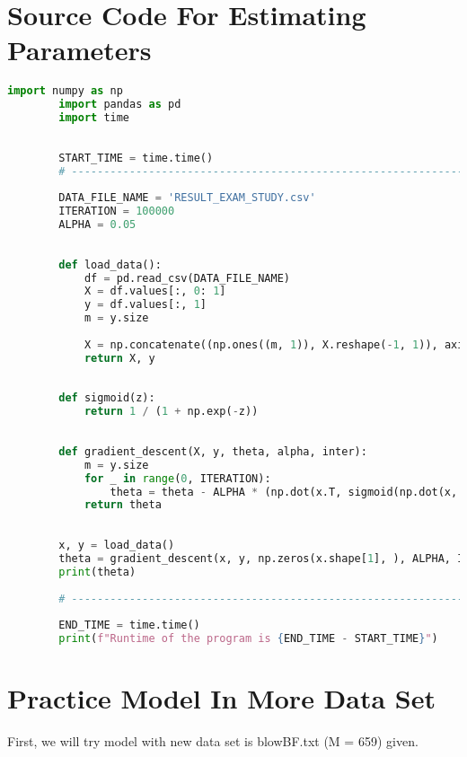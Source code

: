 \documentclass{article}
\begin{document}
\section {Source Code For Estimating Parameters} 
    \begin{lstlisting}[language=Python, caption=Source code for sample 1]
        import numpy as np
        import pandas as pd
        import time
        
        
        START_TIME = time.time()
        # ------------------------------------------------------------------
        
        DATA_FILE_NAME = 'RESULT_EXAM_STUDY.csv'
        ITERATION = 100000
        ALPHA = 0.05 
        
        
        def load_data():
            df = pd.read_csv(DATA_FILE_NAME)
            X = df.values[:, 0: 1]
            y = df.values[:, 1]
            m = y.size
        
            X = np.concatenate((np.ones((m, 1)), X.reshape(-1, 1)), axis=1)
            return X, y
        
        
        def sigmoid(z):
            return 1 / (1 + np.exp(-z))
        
        
        def gradient_descent(X, y, theta, alpha, inter):
            m = y.size
            for _ in range(0, ITERATION):
                theta = theta - ALPHA * (np.dot(x.T, sigmoid(np.dot(x, theta)) - y)) / m
            return theta
        
        
        x, y = load_data()
        theta = gradient_descent(x, y, np.zeros(x.shape[1], ), ALPHA, ITERATION)
        print(theta)
        
        # ------------------------------------------------------------------
        
        END_TIME = time.time()
        print(f"Runtime of the program is {END_TIME - START_TIME}")
    \end{lstlisting}
    
\section{Practice Model In More Data Set} 
First, we will try model with new data set is blowBF.txt (M = 659) given. 
\end{document}
